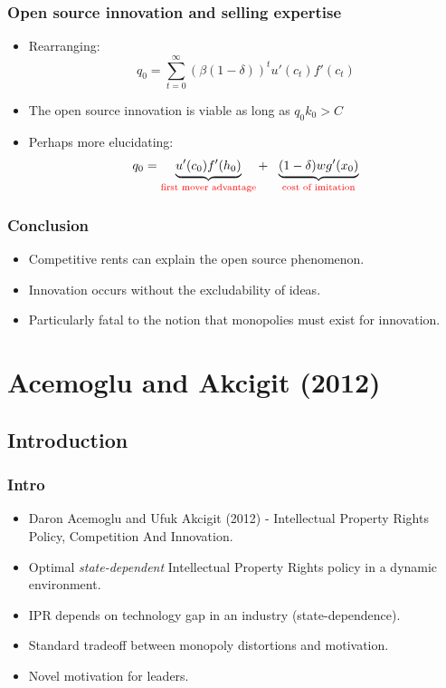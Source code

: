 \documentclass{beamer}
\begin{document}
\begin{frame}[t]\frametitle{Open source innovation and selling expertise}
  \begin{itemize}
    \item<+-> Rearranging:
    \begin{equation*}
       q_0 = \sum_{t=0}^\infty(\beta(1-\delta))^tu'(c_t)f'(c_t)
    \end{equation*}
     \item<+-> The open source innovation is viable as long as $q_0k_0 > C$
     \item<+-> Perhaps more elucidating:\\
	 \begin{equation*}
     q_0 = \underbrace{u'(c_0)f'(h_0)}_{\text{\color{red}first mover advantage}} +\ \ \underbrace{(1-\delta)wg'(x_0)}_{\text{\color{red}cost of imitation}} 
	 \end{equation*} 
  \end{itemize}
\end{frame}

\begin{frame}[t]\frametitle{Conclusion}
  \vspace{20mm}
  \begin{itemize}
  \item<+-> Competitive rents can explain the open source phenomenon.
	\item<+-> Innovation occurs without the excludability of ideas.
	\item<+-> Particularly fatal to the notion that monopolies must exist for innovation.
  \end{itemize}
\end{frame}
\section{Acemoglu and Akcigit (2012)}
\label{sec:acemoglu_and_akcigit_2012}

\subsection{Introduction}
\label{sub:introduction}

\begin{frame}[t]\frametitle{Intro}
  \begin{itemize}
    \item<+-> Daron Acemoglu and Ufuk Akcigit (2012) - Intellectual Property Rights Policy, Competition And Innovation.
    \item<+-> Optimal \emph{state-dependent} Intellectual Property Rights policy in a dynamic environment.
    \item<+-> IPR depends on technology gap in an industry (state-dependence).
    \item<+-> Standard tradeoff between monopoly distortions and motivation.
    \item<+-> Novel motivation for leaders.
  \end{itemize}
\end{frame}
\end{document}
